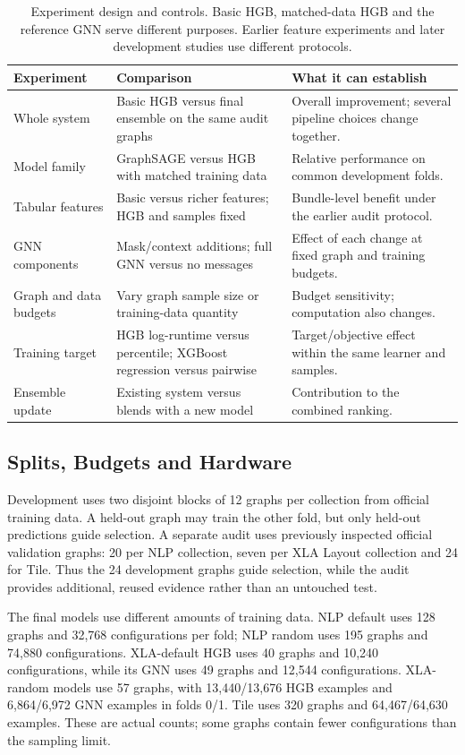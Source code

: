 \documentclass[letterpaper]{article}
\begin{document}
\begin{table}[t]
\centering
\small
\begin{tabular}{@{}p{}p{}p{}@{}}
\toprule
Experiment & Comparison & What it can establish \\
\midrule
Whole system & Basic HGB versus final ensemble on the same audit graphs & Overall improvement; several pipeline choices change together. \\
Model family & GraphSAGE versus HGB with matched training data & Relative performance on common development folds. \\
Tabular features & Basic versus richer features; HGB and samples fixed & Bundle-level benefit under the earlier audit protocol. \\
GNN components & Mask/context additions; full GNN versus no messages & Effect of each change at fixed graph and training budgets. \\
Graph and data budgets & Vary graph sample size or training-data quantity & Budget sensitivity; computation also changes. \\
Training target & HGB log-runtime versus percentile; XGBoost regression versus pairwise & Target/objective effect within the same learner and samples. \\
Ensemble update & Existing system versus blends with a new model & Contribution to the combined ranking. \\
\bottomrule
\end{tabular}
\caption{Experiment design and controls. Basic HGB, matched-data HGB and the reference GNN serve different purposes. Earlier feature experiments and later development studies use different protocols.}
\label{tab:design}
\end{table}

\subsection{Splits, Budgets and Hardware}
\label{sec:splits}
Development uses two disjoint blocks of 12 graphs per collection from official training data. A held-out graph may train the other fold, but only held-out predictions guide selection. A separate audit uses previously inspected official validation graphs: 20 per NLP collection, seven per XLA Layout collection and 24 for Tile. Thus the 24 development graphs guide selection, while the audit provides additional, reused evidence rather than an untouched test.

The final models use different amounts of training data. NLP default uses 128 graphs and 32,768 configurations per fold; NLP random uses 195 graphs and 74,880 configurations. XLA-default HGB uses 40 graphs and 10,240 configurations, while its GNN uses 49 graphs and 12,544 configurations. XLA-random models use 57 graphs, with 13,440/13,676 HGB examples and 6,864/6,972 GNN examples in folds 0/1. Tile uses 320 graphs and 64,467/64,630 examples. These are actual counts; some graphs contain fewer configurations than the sampling limit.
\end{document}
